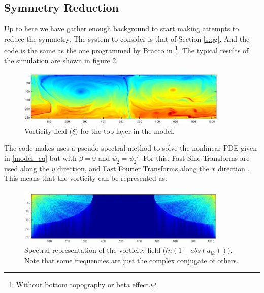 \subsection{Symmetry Reduction}
Up to here we have gather enough background to start making attempts to
reduce the symmetry. The system to consider is that of Section
\ref{s:qg}. And the code is the same as the one programmed by Bracco in
\footnote{Without bottom topography or beta effect.}.
The typical results of the simulation are shown in figure
\ref{f:fouriervort3}.

    \begin{figure}[t]
    \begin{center}
    \includegraphics[width=0.9\textwidth, clip=true]{Vort_example}
    \end{center}
    \caption{Vorticity field ($\xi$) for the top layer in the model.}
    \label{f:fouriervort2}
    \end{figure}

The code makes uses a pseudo-spectral method to solve the nonlinear PDE
given in \ref{model_eq} but with $\beta=0$ and $\psi_2 =\psi_2'$. For
this, Fast Sine Transforms are used along the $y$ direction, and Fast
Fourier Transforms along the $x$ direction . This means that the
vorticity can be represented as:

    \begin{figure}[t]
    \begin{center}
    \includegraphics[width=0.9\textwidth, clip=true]{fourier_example}
    \end{center}
    \caption{Spectral representation of the vorticity field
    ($ln(1+abs(a_{lk}))$). Note that some frequencies are just the complex
    conjugate of others.}
    \label{f:fouriervort3}
    \end{figure}


